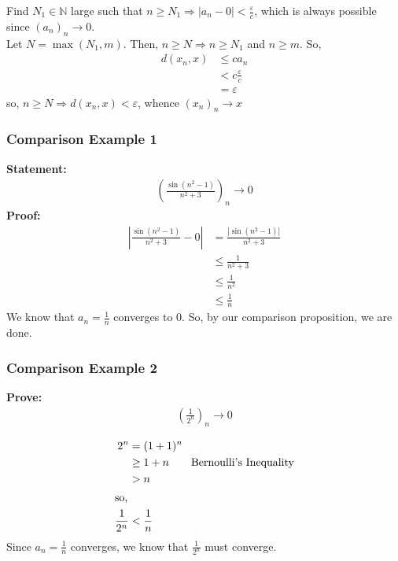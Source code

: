 \documentclass[10pt]{extarticle}
\newcommand{\N}{\mathbb{N}}
\begin{document}
    Find $N_1\in \N$ large such that $n \geq N_1 \Rightarrow |a_n - 0| < \frac{\varepsilon}{c}$, which is always possible since $(a_n)_n \rightarrow 0$.\\

    Let $N = \max(N_1,m)$. Then, $n \geq N\Rightarrow n\geq N_1$ and $n\geq m$. So,
    \begin{align*}
      d(x_n,x) &\leq ca_n\\
      &< c\frac{\varepsilon}{c}\\
      &=\varepsilon
    \end{align*}
    so, $n\geq N \Rightarrow d(x_n,x) < \varepsilon$, whence $(x_n)_n \rightarrow x$
    \subsubsection{Comparison Example 1}%
    \textbf{Statement:}
      \begin{align*}
        \left(\frac{\sin(n^2-1)}{n^2 + 3}\right)_n \rightarrow 0
      \end{align*}
      \textbf{Proof:}
      \begin{align*}
        \left|\frac{\sin(n^2 - 1)}{n^2 + 3} - 0\right| &= \frac{|\sin(n^2 - 1)|}{n^2 + 3}\\
                                                       &\leq \frac{1}{n^2 + 3}\\
                                                       &\leq \frac{1}{n^2}\\
                                                       &\leq \frac{1}{n}
      \end{align*}
      We know that $a_n = \frac{1}{n}$ converges to $0$. So, by our comparison proposition, we are done.
    \subsubsection{Comparison Example 2}%
    \textbf{Prove:}
      \begin{align*}
        \left(\frac{1}{2^n}\right)_n \rightarrow 0
      \end{align*}

      \begin{align*}
        2^n &= (1+1)^n\\
            &\geq 1+n\tag*{Bernoulli's Inequality}\\
            &>n\\
            \shortintertext{so,}
        \frac{1}{2^n} &< \frac{1}{n}
      \end{align*}
      Since $a_n = \frac{1}{n}$ converges, we know that $\frac{1}{2^n}$ must converge.
\end{document}
